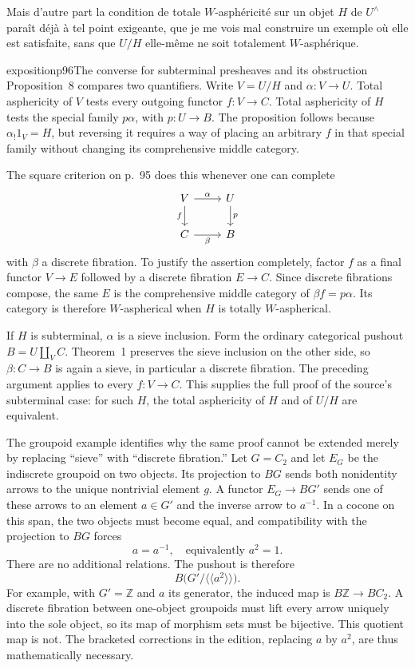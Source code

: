 Mais d'autre part la condition de totale $W$-asphéricité sur un objet $H$ de $U^{\wedge}$ paraît déjà à tel point exigeante, que je me vois mal construire un exemple où elle est satisfaite, sans que $U/H$ elle-même ne soit totalement $W$-asphérique.

\begin{dcomment}{exposition}{p96}{The converse for subterminal presheaves and its obstruction}
Proposition~8 compares two quantifiers. Write $V=U/H$ and $\alpha:V\to U$. Total asphericity of $V$ tests every outgoing functor $f:V\to C$. Total asphericity of $H$ tests the special family $p\alpha$, with $p:U\to B$. The proposition follows because $\alpha_!1_V=H$, but reversing it requires a way of placing an arbitrary $f$ in that special family without changing its comprehensive middle category.

The square criterion on p.~95 does this whenever one can complete
\[
\begin{tikzcd}
V\arrow[r,"\alpha"]\arrow[d,"f"']&U\arrow[d,"p"]\\
C\arrow[r,"\beta"']&B
\end{tikzcd}
\]
with $\beta$ a discrete fibration. To justify the assertion completely, factor $f$ as a final functor $V\to E$ followed by a discrete fibration $E\to C$. Since discrete fibrations compose, the same $E$ is the comprehensive middle category of $\beta f=p\alpha$. Its category is therefore $W$-aspherical when $H$ is totally $W$-aspherical.

If $H$ is subterminal, $\alpha$ is a sieve inclusion. Form the ordinary categorical pushout $B=U\amalg_V C$. Theorem~1 preserves the sieve inclusion on the other side, so $\beta:C\to B$ is again a sieve, in particular a discrete fibration. The preceding argument applies to every $f:V\to C$. This supplies the full proof of the source's subterminal case: for such $H$, the total asphericity of $H$ and of $U/H$ are equivalent.

The groupoid example identifies why the same proof cannot be extended merely by replacing ``sieve'' with ``discrete fibration.'' Let $G=C_2$ and let $E_G$ be the indiscrete groupoid on two objects. Its projection to $BG$ sends both nonidentity arrows to the unique nontrivial element $g$. A functor $E_G\to BG'$ sends one of these arrows to an element $a\in G'$ and the inverse arrow to $a^{-1}$. In a cocone on this span, the two objects must become equal, and compatibility with the projection to $BG$ forces
\[
a=a^{-1},\quad\text{equivalently }a^2=1.
\]
There are no additional relations. The pushout is therefore
\[
B\bigl(G'/\langle\!\langle a^2\rangle\!\rangle\bigr).
\]
For example, with $G'=\mathbb Z$ and $a$ its generator, the induced map is $B\mathbb Z\to BC_2$. A discrete fibration between one-object groupoids must lift every arrow uniquely into the sole object, so its map of morphism sets must be bijective. This quotient map is not. The bracketed corrections in the edition, replacing $a$ by $a^2$, are thus mathematically necessary.


\end{dcomment}

